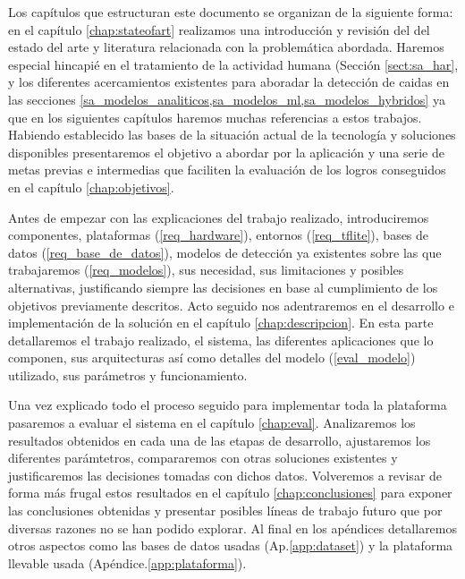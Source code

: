 Los capítulos que estructuran este documento se organizan de la siguiente forma: en el capítulo \ref{chap:stateofart} realizamos una introducción y revisión del del estado del arte y literatura relacionada con la problemática abordada. Haremos especial hincapié en el tratamiento de la actividad humana (Sección \ref{sect:sa_har}, y los diferentes acercamientos existentes para aboradar la detección de caidas en las secciones \ref{sa_modelos_analiticos,sa_modelos_ml,sa_modelos_hybridos} ya que en los siguientes capítulos haremos muchas referencias a estos trabajos. Habiendo establecido las bases de la situación actual de la tecnología y soluciones disponibles presentaremos el objetivo a abordar por la aplicación y una serie de metas previas e intermedias que faciliten la evaluación de los logros conseguidos en el capítulo \ref{chap:objetivos}.   

Antes de empezar con las explicaciones del trabajo realizado, introduciremos componentes, plataformas (\ref{req_hardware}), entornos (\ref{req_tflite}), bases de datos (\ref{req_base_de_datos}), modelos de detección ya existentes sobre las que trabajaremos (\ref{req_modelos}), sus necesidad, sus limitaciones y posibles alternativas, justificando siempre las decisiones en base al cumplimiento de los objetivos previamente descritos. Acto seguido nos adentraremos en el desarrollo e implementación de la solución en el capítulo \ref{chap:descripcion}. En esta parte detallaremos el trabajo realizado, el sistema, las diferentes aplicaciones que lo componen, sus arquitecturas así como detalles del modelo (\ref{eval_modelo}) utilizado, sus parámetros y funcionamiento.

Una vez explicado todo el proceso seguido para implementar toda la plataforma pasaremos a evaluar el sistema en el capítulo \ref{chap:eval}. Analizaremos los resultados obtenidos en cada una de las etapas de desarrollo, ajustaremos los diferentes parámtetros, compararemos con otras soluciones existentes y justificaremos las decisiones tomadas con dichos datos. Volveremos a revisar de forma más frugal estos resultados en el capítulo \ref{chap:conclusiones} para exponer las conclusiones obtenidas y presentar posibles líneas de trabajo futuro que por diversas razones no se han podido explorar. Al final en los apéndices detallaremos otros aspectos como las bases de datos usadas (Ap.\ref{app:dataset}) y la plataforma llevable usada (Apéndice.\ref{app:plataforma}).

%
